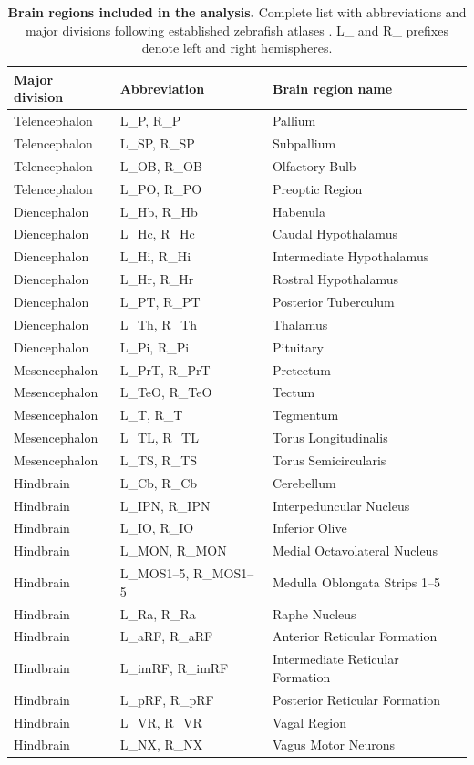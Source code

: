 \documentclass[9pt,twoside]{pnas-new}
\begin{document}
\begin{table}[h]
\centering
\small
\begin{tabular}{lll}
\hline
Major division & Abbreviation & Brain region name \\ \hline
Telencephalon & L\_P, R\_P & Pallium \\
Telencephalon & L\_SP, R\_SP & Subpallium \\
Telencephalon & L\_OB, R\_OB & Olfactory Bulb \\
Telencephalon & L\_PO, R\_PO & Preoptic Region \\
Diencephalon & L\_Hb, R\_Hb & Habenula \\
Diencephalon & L\_Hc, R\_Hc & Caudal Hypothalamus \\
Diencephalon & L\_Hi, R\_Hi & Intermediate Hypothalamus \\
Diencephalon & L\_Hr, R\_Hr & Rostral Hypothalamus \\
Diencephalon & L\_PT, R\_PT & Posterior Tuberculum \\
Diencephalon & L\_Th, R\_Th & Thalamus \\
Diencephalon & L\_Pi, R\_Pi & Pituitary \\
Mesencephalon & L\_PrT, R\_PrT & Pretectum \\
Mesencephalon & L\_TeO, R\_TeO & Tectum \\
Mesencephalon & L\_T, R\_T & Tegmentum \\
Mesencephalon & L\_TL, R\_TL & Torus Longitudinalis \\
Mesencephalon & L\_TS, R\_TS & Torus Semicircularis \\
Hindbrain & L\_Cb, R\_Cb & Cerebellum \\
Hindbrain & L\_IPN, R\_IPN & Interpeduncular Nucleus \\
Hindbrain & L\_IO, R\_IO & Inferior Olive \\
Hindbrain & L\_MON, R\_MON & Medial Octavolateral Nucleus \\
Hindbrain & L\_MOS1--5, R\_MOS1--5 & Medulla Oblongata Strips 1--5 \\
Hindbrain & L\_Ra, R\_Ra & Raphe Nucleus \\
Hindbrain & L\_aRF, R\_aRF & Anterior Reticular Formation \\
Hindbrain & L\_imRF, R\_imRF & Intermediate Reticular Formation \\
Hindbrain & L\_pRF, R\_pRF & Posterior Reticular Formation \\
Hindbrain & L\_VR, R\_VR & Vagal Region \\
Hindbrain & L\_NX, R\_NX & Vagus Motor Neurons \\ \hline
\end{tabular}
\caption{\textbf{Brain regions included in the analysis.} Complete list with abbreviations and major divisions following established zebrafish atlases \citep{Randlett2015ZBrain,Wullimann1996Neuroanatomy,mueller2015atlas}. L\_ and R\_ prefixes denote left and right hemispheres.}
\label{tab:regions}
\end{table}
\end{document}
